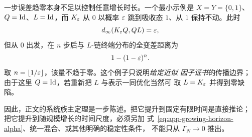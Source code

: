 一步误差趋零本身不足以控制任意增长时长。一个最小示例是
$X=Y=\{0,1\}$、$Q=\operatorname{Id}$、$L=\operatorname{Id}$，而 $K_\varepsilon$ 从 $0$ 以概率
$\varepsilon$ 跳到吸收态 $1$、从 $1$ 保持不动。此时
\[
 d_\infty(K_\varepsilon Q,QL)=\varepsilon,
\]
但从 $0$ 出发，在 $n$ 步后与 $L$-链终端分布的全变差距离为
\[
 1-(1-\varepsilon)^n.
\]
取 $n=\lfloor1/\varepsilon\rfloor$，该量不趋于零。这个例子只说明\emph{给定近似
因子证书}的传播边界；由于这里 $Q=\operatorname{Id}$，若重新把 $L$ 与表示一同优化当然可
取 $L=K_\varepsilon$ 并得到零缺陷。

因此，正文的系统族主定理是一步陈述。把它提升到固定有限时间是直接推论；
把它提升到随规模增长的时间尺度，必须另加
式~\eqref{eq:app-growing-horizon-alpha}、统一混合、或其他明确的稳定性条件，
不能只从 $\Gamma_N\to0$ 推出。
